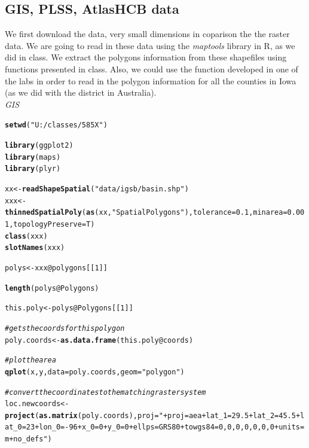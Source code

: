 \documentclass{article}\usepackage[]{graphicx}\usepackage[]{color}
\makeatletter
\newcommand{\hlnum}[1]{\textcolor[rgb]{0.686,0.059,0.569}{#1}}%
\newcommand{\hlstr}[1]{\textcolor[rgb]{0.192,0.494,0.8}{#1}}%
\newcommand{\hlcom}[1]{\textcolor[rgb]{0.678,0.584,0.686}{\textit{#1}}}%
\newcommand{\hlopt}[1]{\textcolor[rgb]{0,0,0}{#1}}%
\newcommand{\hlstd}[1]{\textcolor[rgb]{0.345,0.345,0.345}{#1}}%
\newcommand{\hlkwb}[1]{\textcolor[rgb]{0.69,0.353,0.396}{#1}}%
\newcommand{\hlkwc}[1]{\textcolor[rgb]{0.333,0.667,0.333}{#1}}%
\newcommand{\hlkwd}[1]{\textcolor[rgb]{0.737,0.353,0.396}{\textbf{#1}}}%
\newenvironment{kframe}{%
 \def\at@end@of@kframe{}%
 \ifinner\ifhmode%
  \def\at@end@of@kframe{\end{minipage}}%
  \begin{minipage}{\columnwidth}%
 \fi\fi%
 \def\FrameCommand##1{\hskip\@totalleftmargin \hskip-\fboxsep
 \colorbox{shadecolor}{##1}\hskip-\fboxsep
     \hskip-\linewidth \hskip-\@totalleftmargin \hskip\columnwidth}%
 \MakeFramed {\advance\hsize-\width
   \@totalleftmargin\z@ \linewidth\hsize
   \@setminipage}}%
 {\par\unskip\endMakeFramed%
 \at@end@of@kframe}
\newenvironment{knitrout}{}{} %
\makeatother
\begin{document}
\begin{itemize}
\subsection{ GIS, PLSS, AtlasHCB data }

We first download the data, very small dimensions in coparison the the raster data. We are going to read in these data using the \textit{maptools} library in R, as we did in class. We extract the polygons information from these shapefiles using functions presented in class. Also, we could use the function developed in one of the labs in order to read in the polygon information for all the counties in Iowa (as we did with the district in Australia). \\

\textit{GIS}\\

\begin{knitrout}
\color{fgcolor}\begin{kframe}
\begin{alltt}
\hlkwd{setwd}\hlstd{(}\hlstr{"U:/classes/585X"}\hlstd{)}

\hlkwd{library}\hlstd{(ggplot2)}
\hlkwd{library}\hlstd{(maps)}
\hlkwd{library}\hlstd{(plyr)}

\hlstd{xx} \hlkwb{<-} \hlkwd{readShapeSpatial}\hlstd{(}\hlstr{"data/igsb/basin.shp"}\hlstd{)}
\hlstd{xxx} \hlkwb{<-} \hlkwd{thinnedSpatialPoly}\hlstd{(}\hlkwd{as}\hlstd{(xx,} \hlstr{"SpatialPolygons"}\hlstd{),} \hlkwc{tolerance} \hlstd{=} \hlnum{0.1}\hlstd{,} \hlkwc{minarea} \hlstd{=} \hlnum{0.001}\hlstd{,} \hlkwc{topologyPreserve} \hlstd{= T)}
\hlkwd{class}\hlstd{(xxx)}
\hlkwd{slotNames}\hlstd{(xxx)}

\hlstd{polys} \hlkwb{<-} \hlstd{xxx}\hlopt{@}\hlkwc{polygons}\hlstd{[[}\hlnum{1}\hlstd{]]}

\hlkwd{length}\hlstd{(polys}\hlopt{@}\hlkwc{Polygons}\hlstd{)}

\hlstd{this.poly} \hlkwb{<-} \hlstd{polys}\hlopt{@}\hlkwc{Polygons}\hlstd{[[}\hlnum{1}\hlstd{]]}

\hlcom{# gets the coords for this polygon}
\hlstd{poly.coords} \hlkwb{<-} \hlkwd{as.data.frame}\hlstd{(this.poly}\hlopt{@}\hlkwc{coords}\hlstd{)}

\hlcom{# plot the area}
\hlkwd{qplot}\hlstd{(x, y,} \hlkwc{data} \hlstd{= poly.coords,} \hlkwc{geom} \hlstd{=} \hlstr{"polygon"}\hlstd{)}

\hlcom{# convert the coordinates to the matching raster system}
\hlstd{loc.newcoords} \hlkwb{<-} \hlkwd{project}\hlstd{(}\hlkwd{as.matrix}\hlstd{(poly.coords),} \hlkwc{proj} \hlstd{=} \hlstr{"+proj=aea +lat_1=29.5 +lat_2=45.5 +lat_0=23 +lon_0=-96 +x_0=0 +y_0=0 +ellps=GRS80 +towgs84=0,0,0,0,0,0,0 +units=m +no_defs"}\hlstd{)}


\end{alltt}
\end{kframe}
\end{knitrout}
\end{itemize}
\end{document}
